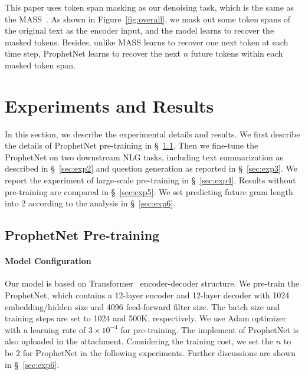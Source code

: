 \documentclass[11pt,a4paper]{article}
\begin{document}

This paper uses token span masking as our denoising task, which is the same as the MASS~\cite{song2019mass}.
As shown in Figure~\ref{fig:overall}, we mask out some token spans of the original text as the encoder input, and the model learns to recover the masked tokens.
Besides, unlike MASS learns to recover one next token at each time step, ProphetNet learns to recover the next $n$ future tokens within each masked token span.


\section{Experiments and Results}
In this section, we describe the experimental details and results.
We first describe the details of ProphetNet pre-training in \S~\ref{sec:exp1}.
Then we fine-tune the ProphetNet on two downstream NLG tasks, including text summarization as described in \S~\ref{sec:exp2} and question generation as reported in \S~\ref{sec:exp3}.
We report the experiment of large-scale pre-training in \S~\ref{sec:exp4}. Results without pre-training are compared in \S~\ref{sec:exp5}. We set predicting future gram length into 2 according to the analysis in \S~\ref{sec:exp6}.


\subsection{ProphetNet Pre-training}\label{sec:exp1}
\paragraph{Model Configuration} 
Our model is based on Transformer~\cite{vaswani2017attention} encoder-decoder structure. 
We pre-train the ProphetNet, which contains a 12-layer encoder and 12-layer decoder with 1024 embedding/hidden size and 4096 feed-forward filter size. The batch size and training steps are set to 1024 and 500K, respectively. 
We use Adam optimizer~\cite{kingma2014adam} with a learning rate of $3 \times 10^{-4}$ for pre-training. 
The implement of ProphetNet is also uploaded in the attachment.
Considering the training cost, we set the $n$ to be 2 for ProphetNet in the following experiments. Further discussions are shown in \S~\ref{sec:exp6}.
\end{document}
